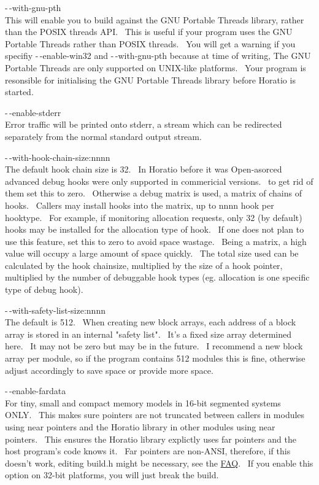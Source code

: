 \documentclass{article}
\begin{document}
\par -$\,$-with-gnu-pth\\
This will enable you to build against the GNU Portable Threads library,
rather than the POSIX threads API.~ This is useful if your program
uses the GNU Portable Threads rather than POSIX threads.~ You will
get a warning if you specifiy -$\,$-enable-win32 and -$\,$-with-gnu-pth because
at time of writing, The GNU Portable Threads are only supported on
UNIX-like platforms.~ Your program is resonsible for initialising
the GNU Portable Threads library before Horatio is started.\\

\par -$\,$-enable-stderr
\\
Error traffic will be printed onto stderr, a stream which can be
redirected separately from the normal standard output stream.\\

\par -$\,$-with-hook-chain-size:nnnn
\\
The default hook chain size is 32.~ In Horatio before it was
Open-asorced advanced debug hooks were only supported in commericial
versions.~
to get rid of them set this to zero.~ Otherwise a debug matrix is
used, a matrix of chains of hooks.~ Callers may install hooks into
the matrix, up to nnnn hook per hooktype.~ For example, if
monitoring
allocation requests, only 32 (by default) hooks may be installed for
the
allocation type of hook.~ If one does not plan to use this
feature,
set this to zero to avoid space wastage.~ Being a matrix, a high
value will occupy a large amount of space quickly.~ The total size
used can be calculated by the hook chainsize, multiplied by the size of
a hook pointer, multiplied by the number of debuggable hook types (eg.
allocation is one specific type of debug hook).\\

\par -$\,$-with-safety-list-size:nnnn
\\
The default is 512.~ When creating new block arrays, each address
of a block array is stored in an internal "safety list".~ It's a
fixed
size array determined here.~ It may not be zero but may be in the
future.~ I recommend a new block array per module, so if the
program
contains 512 modules this is fine, otherwise adjust accordingly to save
space or provide more space.

\par -$\,$-enable-fardata
\\
For tiny, small and compact memory models in 16-bit segmented systems
ONLY.~ This makes sure pointers are not truncated between callers
in modules using near pointers and the Horatio library in other
modules
using near pointers.~ This ensures the Horatio library explictly
uses far pointers and the host program's code knows it.~ Far
pointers are non-ANSI, therefore, if this doesn't work,
editing build.h might be necessary, see the \href{#FAQ}{FAQ}.~
If you enable this option on 32-bit platforms, you will just break the
build.\\
\end{document}
